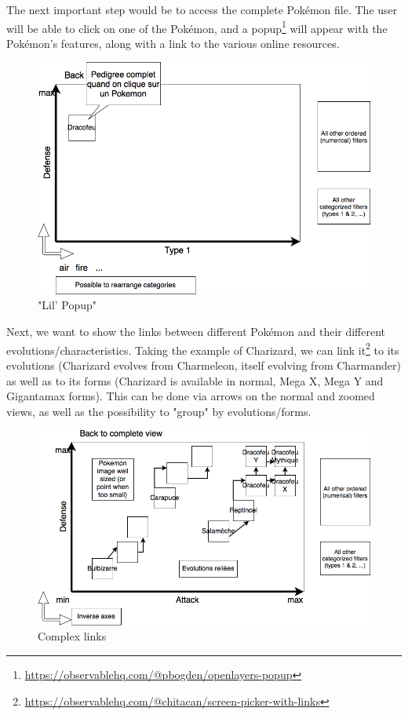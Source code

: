 \documentclass[10pt,conference,compsocconf]{IEEEtran}
\begin{document}
The next important step would be to access the complete Pokémon file. The user will be able to click on one of the Pokémon, and a popup\footnote{\url{https://observablehq.com/@pbogden/openlayers-popup}} will appear with the Pokémon's features, along with a link to the various online resources.


\begin{figure}
  \includegraphics[scale=0.4]{img/2_4.png}
  \caption{"Lil' Popup"}
  \label{fig:mvp_popup}
\end{figure}

Next, we want to show the links between different Pokémon and their different evolutions/characteristics. Taking the example of Charizard, we can link it\footnote{\url{https://observablehq.com/@chitacan/screen-picker-with-links}} to its evolutions (Charizard evolves from Charmeleon, itself evolving from Charmander) as well as to its forms (Charizard is available in normal, Mega X, Mega Y and Gigantamax forms). This can be done via arrows on the normal and zoomed views, as well as the possibility to "group" by evolutions/forms.

\begin{figure}
  \includegraphics[scale=0.4]{img/2_2.png}
  \caption{Complex links}
  \label{fig:complex}
\end{figure}
\end{document}
